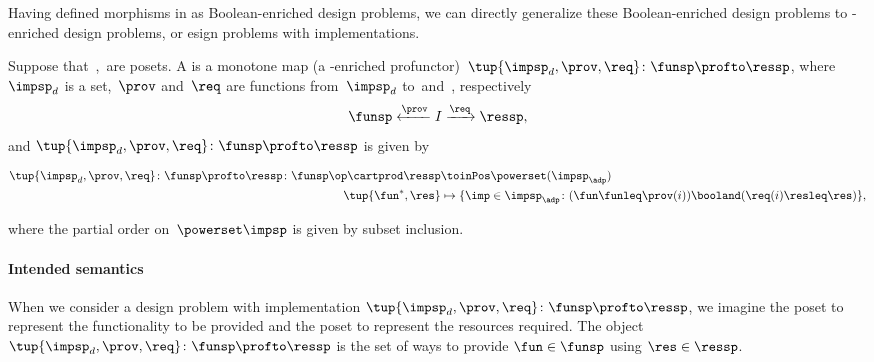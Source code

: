 {    Having defined morphisms in \DP as Boolean-enriched design problems, we can directly generalize these Boolean-enriched design problems to \Set-enriched design problems, or esign problems with implementations.
    \begin{widepar}
        \begin{definition}
            \label{def:dpwithimp}
            Suppose that~\funsp,~\ressp are posets.
            A \emph{} is a monotone map (a \Set-enriched profunctor)~$\tup{\impsp_d,\prov,\req}\colon \funsp\profto \ressp$, where~$\impsp_d$ is a set,~$\prov$ and~$\req$ are functions from~$\impsp_d$ to~\funsp and~\ressp, respectively
            \begin{equation*}
                \funsp \xleftarrow{\prov} I \xrightarrow{\req} \ressp,
            \end{equation*}
            and $\tup{\impsp_d,\prov,\req}\colon \funsp\profto \ressp$ is given by

            \begin{equation}
                \begin{aligned}
                    \tup{\impsp_d,\prov,\req}\colon \funsp\profto \ressp \colon \funsp\op \cartprod \ressp & \toinPos \powerset(\impsp_\adp) \\
                    \tup{\fun^*, \res}                                                                     & \mapsto \{ \imp \in \impsp_\adp \colon ( \fun \funleq \prov(i)) \booland (\req(i) \resleq \res) \},
                \end{aligned}
            \end{equation}

            where the partial order on~$\powerset\impsp$ is given by subset inclusion.
        \end{definition}
    \end{widepar}

    \paragraph{Intended semantics}
    When we consider a design problem with implementation $\tup{\impsp_d, \prov, \req}\colon \funsp\profto \ressp$, we imagine the poset \funsp to represent the functionality to be provided and the poset \ressp to represent the resources required.
    The object $\tup{\impsp_d,\prov,\req}\colon \funsp\profto \ressp$ is the set of ways to provide $\fun\in \funsp$ using $\res\in \ressp$.

}
